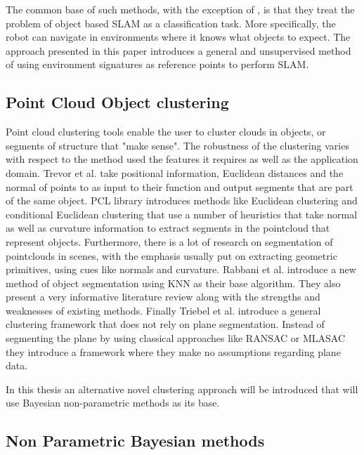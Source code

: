 \documentclass[twoside,hidelinks]{article}
\begin{document}
The common base of such methods, with the exception of \cite{objectDisc}, is that they treat the problem of object based SLAM as a classification task. More specifically, the robot can navigate in environments where it knows what objects to expect.
The approach presented in this paper introduces a general and unsupervised method of using environment signatures as reference points to perform SLAM.

\subsection{Point Cloud Object clustering}


Point cloud clustering tools enable the user to cluster clouds in objects, or segments of structure that "make sense". The robustness of the clustering varies with respect to the method used the features it requires as well as the application domain.
Trevor et al.\cite{pointSeg} take positional information, Euclidean distances and the normal of points to as input to their function and output segments that are part of the same object. PCL library\cite{pcl} introduces methods like Euclidean clustering and conditional Euclidean clustering that use a number of heuristics that take normal as well as curvature information to extract segments in the pointcloud that represent objects. Furthermore, there is a lot of research on segmentation of pointclouds in scenes, with the emphasis usually put on extracting geometric primitives\cite{planarSeg},\cite{planarSeg2} using cues like normals and curvature. Rabbani et al.\cite{segOverview} introduce a new method of object segmentation using KNN as their base algorithm. They also present a very informative literature review along with the strengths and weaknesses of existing methods. Finally Triebel et al.\cite{smartSeg} introduce a general clustering framework that does not rely on plane segmentation. Instead of segmenting the plane by using classical approaches like RANSAC or MLASAC they introduce a framework where they make no assumptions regarding plane data. 
 
In this thesis an alternative novel clustering approach will be introduced that will use Bayesian non-parametric methods as its base.

\subsection{Non Parametric Bayesian methods}
\end{document}
